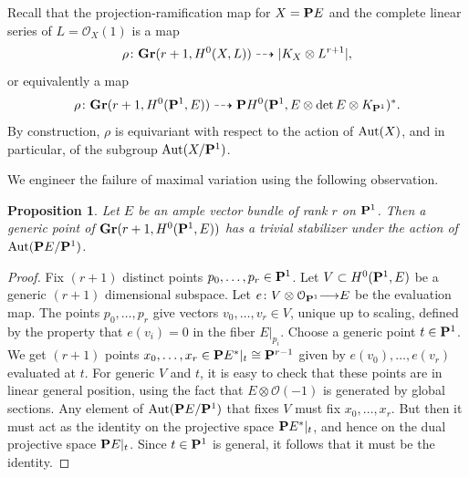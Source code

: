 \documentclass[11pt,reqno]{amsart}
\theoremstyle{plain}
\newtheorem{proposition}[theorem]{Proposition}
\theoremstyle{definition}
\theoremstyle{remark}
\numberwithin{equation}{section}
\renewcommand{\to}{{\longrightarrow}}
\numberwithin{equation}{section}
\renewcommand{\O}{\mathcal O}
\begin{document}
Recall that the projection-ramification map for $X = \P E$ and the complete linear series of $L = \O_X(1)$ is a map
\[ \rho \from \Gr(r+1, H^0(X, L)) \dashrightarrow |K_X \otimes L^{r+1}|,\]
or equivalently a map
\[ \rho \from \Gr(r+1, H^0(\P^1, E)) \dashrightarrow \P H^0(\P^1, E \otimes \det E \otimes K_{\P^1})^*.\]
By construction, $\rho$ is equivariant with respect to the action of $\Aut(X)$, and in particular, of the subgroup $\Aut(X/\P^1)$.

We engineer the failure of maximal variation using the following observation.
\begin{proposition}\label{prop:trivialStabilizer}
  Let $E$ be an ample vector bundle of rank $r$ on $\P^1$.
  Then a generic point of $\Gr(r+1, H^0(\P^1, E))$ has a trivial stabilizer under the action of $\Aut(\P E/\P^1)$.
\end{proposition}
\begin{proof}
  Fix $(r+1)$ distinct points $p_0, \dots, p_r \in \P^1$.
  Let $V \subset H^0(\P^1, E)$ be a generic $(r+1)$ dimensional subspace.
  Let $e \from V \otimes \O_{\P^1} \to E$ be the evaluation map.
  The points $p_0, \dots, p_r$ give vectors $v_0, \dots, v_r \in V$, unique up to scaling, defined by the property that $e(v_i) = 0$ in the fiber $E|_{p_i}$.
  Choose a generic point $t \in \P^1$.
  We get $(r+1)$ points $x_0, \dots, x_r \in \P E^*|_{t} \cong \P^{r-1}$ given by $e(v_0), \dots, e(v_r)$ evaluated at $t$.
  For generic $V$ and $t$, it is easy to check that these points are in linear general position, using the fact that $E \otimes \O(-1)$ is generated by global sections.
  Any element of $\Aut(\P E/\P^1)$ that fixes $V$ must fix $x_0, \dots, x_r$.
  But then it must act as the identity on the projective space $\P E^*|_t$, and hence on the dual projective space $\P E|_t$.
  Since $t \in \P^1$ is general, it follows that it must be the identity.
\end{proof}
\end{document}
